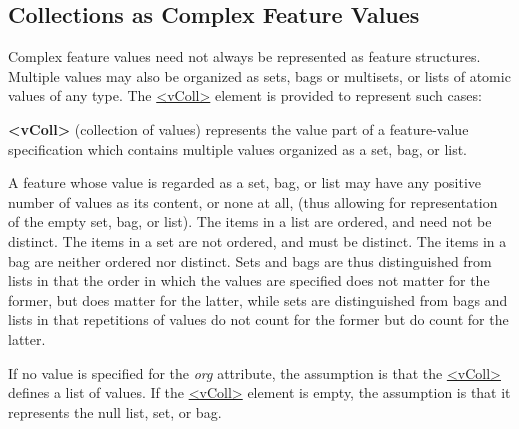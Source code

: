 \subsection[{Collections as Complex Feature Values}]{Collections as Complex Feature Values}\label{FSSS}\par
Complex feature values need not always be represented as feature structures. Multiple values may also be organized as sets, bags or multisets, or lists of atomic values of any type. The \hyperref[TEI.vColl]{<vColl>} element is provided to represent such cases: 
\begin{sansreflist}
  
\item [\textbf{<vColl>}] (collection of values) represents the value part of a feature-value specification which contains multiple values organized as a set, bag, or list.
\end{sansreflist}
\par
A feature whose value is regarded as a set, bag, or list may have any positive number of values as its content, or none at all, (thus allowing for representation of the empty set, bag, or list). The items in a list are ordered, and need not be distinct. The items in a set are not ordered, and must be distinct. The items in a bag are neither ordered nor distinct. Sets and bags are thus distinguished from lists in that the order in which the values are specified does not matter for the former, but does matter for the latter, while sets are distinguished from bags and lists in that repetitions of values do not count for the former but do count for the latter. \par
If no value is specified for the {\itshape org} attribute, the assumption is that the \hyperref[TEI.vColl]{<vColl>} defines a list of values. If the \hyperref[TEI.vColl]{<vColl>} element is empty, the assumption is that it represents the null list, set, or bag. \par
